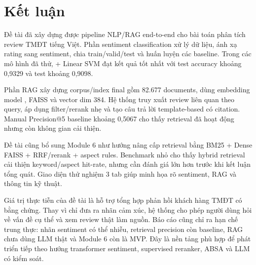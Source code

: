 \chapter{Kết luận}
Đề tài đã xây dựng được pipeline NLP/RAG end-to-end cho bài toán phân tích review TMĐT tiếng Việt. Phần sentiment classification xử lý dữ liệu, ánh xạ rating sang sentiment, chia train/valid/test và huấn luyện các baseline. Trong các mô hình đã thử, \TFIDF{} + Linear SVM đạt kết quả tốt nhất với test accuracy khoảng 0,9329 và test \MacroFOne{} khoảng 0,9098.

Phần RAG xây dựng corpus/index final gồm 82.677 documents, dùng embedding model , FAISS  và vector dim 384. Hệ thống truy xuất review liên quan theo query, áp dụng filter/rerank nhẹ và tạo câu trả lời template-based có citation. Manual Precision@5 baseline khoảng 0,5067 cho thấy retrieval đã hoạt động nhưng còn không gian cải thiện.

Đề tài cũng bổ sung Module 6 như hướng nâng cấp retrieval bằng BM25 + Dense FAISS + RRF/rerank + aspect rules. Benchmark nhỏ cho thấy hybrid retrieval cải thiện keyword/aspect hit-rate, nhưng cần đánh giá lớn hơn trước khi kết luận tổng quát. Giao diện thử nghiệm 3 tab giúp minh họa rõ sentiment, RAG và thông tin kỹ thuật.

Giá trị thực tiễn của đề tài là hỗ trợ tổng hợp phản hồi khách hàng TMĐT có bằng chứng. Thay vì chỉ đưa ra nhãn cảm xúc, hệ thống cho phép người dùng hỏi về vấn đề cụ thể và xem review thật làm nguồn. Báo cáo cũng chỉ ra hạn chế trung thực: nhãn sentiment có thể nhiễu, retrieval precision còn baseline, RAG chưa dùng LLM thật và Module 6 còn là MVP. Đây là nền tảng phù hợp để phát triển tiếp theo hướng transformer sentiment, supervised reranker, ABSA và LLM có kiểm soát.

